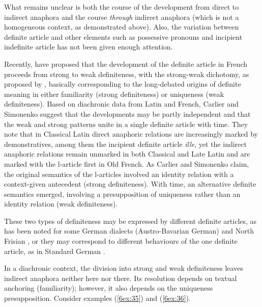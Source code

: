 \documentclass[output=paper]{langsci/langscibook}
\begin{document}
What remains unclear is both the course of the development from direct to indirect anaphora and the course {\emph{through}} indirect anaphora (which is not a homogeneous context, as demonstrated above). Also, the variation between definite article and other elements such as possessive pronouns and incipient indefinite article has not been given enough attention.

Recently, \cite{carlier:simonenko:16} have proposed that the development of the definite article in French proceeds from strong to weak definiteness, with the strong-weak dichotomy, as proposed by \cite{schwarz:09}, basically corresponding to the long-debated origins of definite meaning in either familiarity (strong definiteness) or uniqueness (weak definiteness). Based on diachronic data from Latin and French, Carlier and Simonenko suggest that the developments may be partly independent and that the weak and strong patterns unite in a single definite article with time. They note that in Classical Latin direct anaphoric relations are increasingly marked by demonstratives, among them the incipient definite article {\emph{ille}}, yet the indirect anaphoric relations remain unmarked in both Classical and Late Latin and are marked with the l-article first in Old French. As Carlier and Simonenko claim, the original semantics of the l-articles involved an identity relation with a context-given antecedent (strong definiteness). With time, an alternative definite semantics emerged, involving a presupposition of uniqueness rather than an identity relation (weak definiteness). 

These two types of definiteness may be expressed by different definite articles, as has been noted for some German dialects (Austro-Bavarian German) and North Frisian \citep{ebert:71}, or they may correspond to different behaviours of the one definite article, as in Standard German \citep{schwarz:09}. 

In a diachronic context, the division into strong and weak definiteness leaves indirect anaphora neither here nor there. Its resolution depends on textual anchoring (familiarity); however, it also depends on the uniqueness presupposition. Consider examples (\ref{6ex:35}) and (\ref{6ex:36}).
\end{document}
